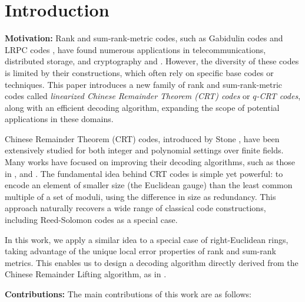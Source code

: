 \documentclass{article}
\theoremstyle{definition}
\begin{document}
\section{Introduction} \label{intro}

\indent \textbf{Motivation:} Rank and sum-rank-metric codes, such as Gabidulin \cite{gabidulin_theory_1985} codes and LRPC codes \cite{gaborit_low_2013}, have found numerous applications in telecommunications, distributed storage, and cryptography \cite{bartz_rank-metric_2022} and \cite{martinez-penas_codes_2022}. However, the diversity of these codes is limited by their constructions, which often rely on specific base codes or techniques. This paper introduces a new family of rank and sum-rank-metric codes called \textit{linearized Chinese Remainder Theorem (CRT) codes} or \textit{$q$-CRT codes}, along with an efficient decoding algorithm, expanding the scope of potential applications in these domains.

Chinese Remainder Theorem (CRT) codes, introduced by Stone \cite{stone_multiple-burst_1963}, have been extensively studied for both integer and polynomial settings over finite fields. Many works have focused on improving their decoding algorithms, such as those in \cite{goldreich_chinese_1999}, \cite{guruswami_soft-decision_2000}  and \cite{yu_polynomial_2012}\color{black}. The fundamental idea behind CRT codes is simple yet powerful: to encode an element of smaller size (the Euclidean gauge) than the least common multiple of a set of moduli, using the difference in size as redundancy. This approach naturally recovers a wide range of classical code constructions, including Reed-Solomon codes \cite{reed_polynomial_1960} as a special case.

In this work, we apply a similar idea to a special case of right-Euclidean rings, taking advantage of the unique local error properties of rank and sum-rank metrics. This enables us to design a decoding algorithm directly derived from the Chinese Remainder Lifting algorithm,  as in \cite{yu_polynomial_2012}\color{black}.

\textbf{Contributions:} The main contributions of this work are as follows:
\end{document}
